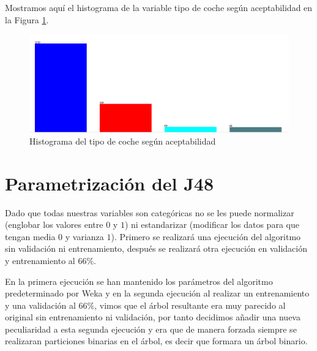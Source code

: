 \documentclass[a4paper, 11pt, twoside, openany, onecolumn, final]{memoir}
\begin{document}
Mostramos aquí el histograma de la variable tipo de coche según aceptabilidad en la Figura \ref{HistoVarSalidaClasi}. 
	\begin{figure}
  		\centering
   		\includegraphics[width=1\textwidth]{Imagenes/HistogramaVarSalidaClasif}
  		\caption{Histograma del tipo de coche según aceptabilidad}
  		\label{HistoVarSalidaClasi}
	\end{figure}
	\section{Parametrización del J48}
		Dado que todas nuestras variables son categóricas no se les puede normalizar (englobar los valores entre $0$ y $1$) ni estandarizar (modificar los datos para que tengan media $0$ y varianza $1$). 
		Primero se realizará una ejecución del algoritmo sin validación ni entrenamiento, después se realizará otra ejecución en validación y entrenamiento al $66\%$.
		
		En la primera ejecución se han mantenido los parámetros del algoritmo predeterminado por Weka y en la segunda ejecución al realizar un entrenamiento y una validación al $66\%$, vimos que el árbol resultante era muy parecido al original sin entrenamiento ni validación, por tanto decidimos añadir una nueva peculiaridad a esta segunda ejecución y era que de manera forzada siempre se realizaran particiones binarias en el árbol, es decir que formara un árbol binario.
\end{document}
